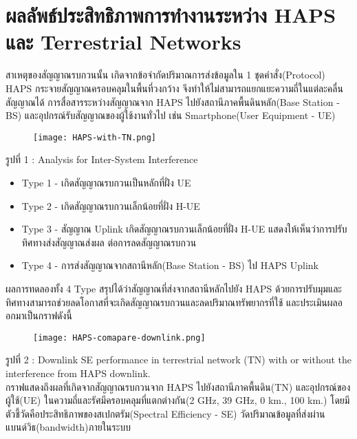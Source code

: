 \section{ผลลัพธ์ประสิทธิภาพการทำงานระหว่าง HAPS และ Terrestrial Networks}
สาเหตุของสัญญาณรบกวนนั้น เกิดจากข้อจำกัดปริมาณการส่งข้อมูลใน 1 ชุดคำสั่ง(Protocol)
HAPS กระจายสัญญาณครอบคลุมในพื้นที่วงกว้าง จึงทำให้ไม่สามารถแยกแยะความถี่ในแต่ละคลื่นสัญญาณได้
การสื่อสารระหว่างสัญญาณจาก HAPS ไปยังสถานีภาคพื้นดินหลัก(Base Station - BS)
และอุปกรณ์รับสัญญาณของผู้ใช้งานทั่วไป เช่น Smartphone(User Equipment - UE) 

\begin{figure}[h]
\centering
\texttt{[image: HAPS-with-TN.png]}
\end{figure}

\centering รูปที่ 1 : Analysis for Inter-System Interference 
\begin{itemize}
    \item Type 1 - เกิดสัญญาณรบกวนเป็นหลักที่ฝั่ง UE
    \item Type 2 - เกิดสัญญาณรบกวนเล็กน้อยที่ฝั่ง H-UE
    \item Type 3 - สัญญาณ Uplink เกิดสัญญาณรบกวนเล็กน้อยที่ฝั่ง H-UE แสดงให้เห็นว่าการปรับทิศทางส่งสัญญาณส่งผล
    ต่อการลดสัญญาณรบกวน
    \item Type 4 - การส่งสัญญาณจากสถานีหลัก(Base Station - BS) ไป HAPS Uplink
\end{itemize}

ผลการทดลองทั้ง 4 Type สรุปได้ว่าสัญญาณที่ส่งจากสถานีหลักไปยัง HAPS ด้วยการปรับมุมและทิศทางสามารถช่วยลดโอกาสที่จะเกิดสัญญาณรบกวนและลดปริมาณทรัพยากรที่ใช้ และประเมินผลออกมาเป็นกราฟดังนี้

\begin{figure}[h]
\centering
\texttt{[image: HAPS-comapare-downlink.png]}
\end{figure}

\centering รูปที่ 2 : Downlink SE performance in terrestrial network (TN) with or without the interference 
from HAPS downlink.
\\
กราฟแสดงถึงผลที่เกิดจากสัญญาณรบกวนจาก HAPS ไปยังสถานีภาคพื้นดิน(TN) และอุปกรณ์ของผู้ใช้(UE)
ในความถี่และรัศมีครอบคลุมที่แตกต่างกัน(2 GHz, 39 GHz, 0 km., 100 km.) โดยมีตัวชี้วัดคือประสิทธิภาพของสเปกตรัม(Spectral Efficiency - SE)
วัดปริมาณข้อมูลที่ส่งผ่านแบนด์วิธ(bandwidth)ภายในระบบ


